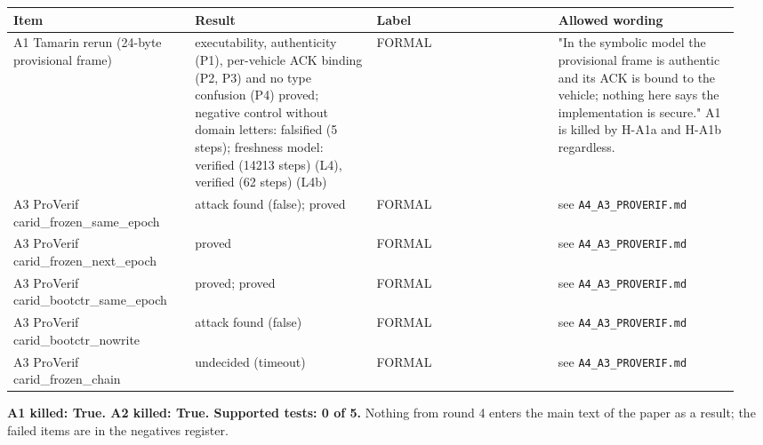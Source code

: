 {\scriptsize\raggedright
\begin{longtable}{p{0.237\linewidth}p{0.237\linewidth}p{0.237\linewidth}p{0.237\linewidth}}
\toprule
Item & Result & Label & Allowed wording \\
\midrule
\endhead
A1 Tamarin rerun (24-byte provisional frame) & executability, authenticity (P1), per-vehicle ACK binding (P2, P3) and no type confusion (P4) proved; negative control without domain letters: falsified (5 steps); freshness model: verified (14213 steps) (L4), verified (62 steps) (L4b) & FORMAL & "In the symbolic model the provisional frame is authentic and its ACK is bound to the vehicle; nothing here says the implementation is secure." A1 is killed by H-A1a and H-A1b regardless. \\
A3 ProVerif carid\_frozen\_same\_epoch & attack found (false); proved & FORMAL & see \texttt{A4\_A3\_PROVERIF.md} \\
A3 ProVerif carid\_frozen\_next\_epoch & proved & FORMAL & see \texttt{A4\_A3\_PROVERIF.md} \\
A3 ProVerif carid\_bootctr\_same\_epoch & proved; proved & FORMAL & see \texttt{A4\_A3\_PROVERIF.md} \\
A3 ProVerif carid\_bootctr\_nowrite & attack found (false) & FORMAL & see \texttt{A4\_A3\_PROVERIF.md} \\
A3 ProVerif carid\_frozen\_chain & undecided (timeout) & FORMAL & see \texttt{A4\_A3\_PROVERIF.md} \\
\bottomrule
\end{longtable}}

\textbf{A1 killed: True. A2 killed: True. Supported tests: 0 of 5.} Nothing from round 4 enters the main text of the paper as a result; the failed items are in the negatives register.

